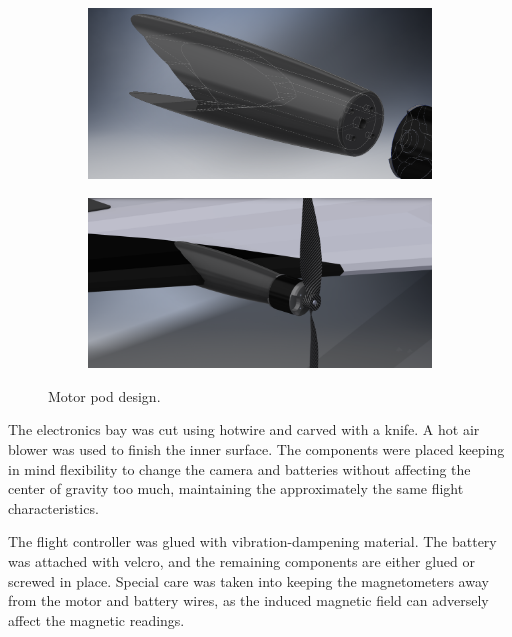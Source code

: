  \begin{figure}
\centering
\begin{subfigure}{.5\textwidth}
  \centering
  \includegraphics[width=\linewidth]{figs/pods1.png}
  
\end{subfigure}%
\begin{subfigure}{.5\textwidth}
  \centering
  \includegraphics[width=\linewidth]{figs/pods2.png}

\end{subfigure}
\caption{Motor pod design.}
\label{fig:pod}
\end{figure}



The electronics bay was cut using hotwire and carved with a knife. A hot air blower was used to finish the inner surface. The components were placed keeping in mind flexibility to change the camera and batteries without affecting the center of gravity too much, maintaining the approximately the same flight characteristics.

The flight controller was glued with vibration-dampening material. The battery was attached with velcro, and the remaining components are either glued or screwed in place. Special care was taken into keeping the magnetometers away from the motor and battery wires, as the induced magnetic field can adversely affect the magnetic readings.

